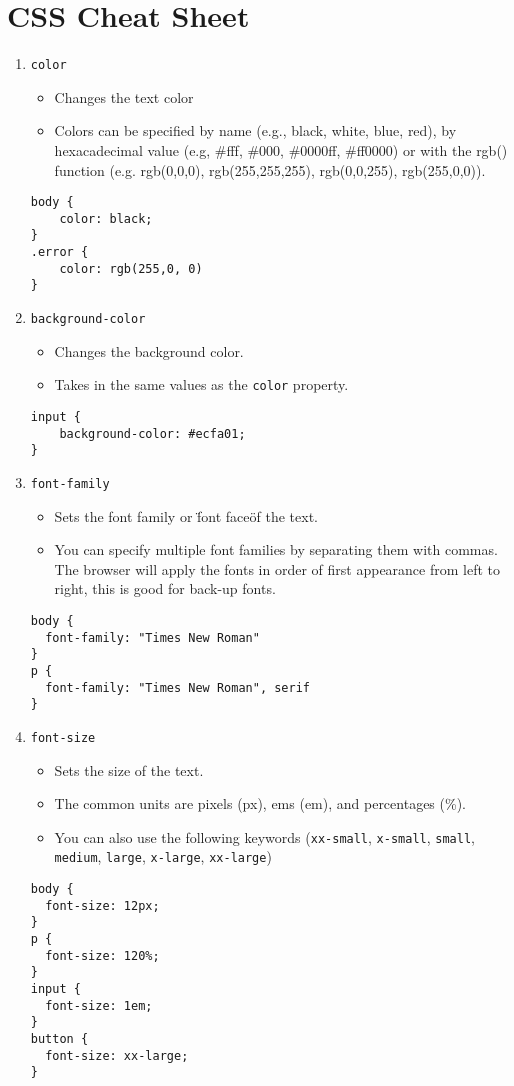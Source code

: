 \documentclass[12pt]{article}
\begin{document}
\section{CSS Cheat Sheet}

\begin{enumerate}

\item{\texttt{color}}  
\begin{itemize}
    \item Changes the text color
    \item Colors can be specified by name (e.g., black, white, blue, red), by hexacadecimal value (e.g, \#fff, \#000, \#0000ff, \#ff0000) or with the rgb() function (e.g. rgb(0,0,0), rgb(255,255,255), rgb(0,0,255), rgb(255,0,0)).
\end{itemize}
\begin{lstlisting}[frame=single]
body {
    color: black;
}
.error {
    color: rgb(255,0, 0)
}
\end{lstlisting}

\item{\texttt{background-color}}
\begin{itemize}
    \item Changes the background color.  
    \item Takes in the same values as the \texttt{color} property.
\end{itemize}    
\begin{lstlisting}[frame=single]
input {
    background-color: #ecfa01; 
}
\end{lstlisting}
    
\item{\texttt{font-family}}
\begin{itemize}
    \item Sets the font family or \"font face\" of the text.
    \item You can specify multiple font families by separating them with commas.  The browser will apply the fonts in order of first appearance from left to right, this is good for back-up fonts.
\end{itemize}    
\begin{lstlisting}[frame=single]
body {
  font-family: "Times New Roman"
}
p {
  font-family: "Times New Roman", serif
}
\end{lstlisting}
    

\item{\texttt{font-size}}
\begin{itemize}
    \item Sets the size of the text.  
    \item The common units are pixels (px), ems (em), and percentages (\%).  
    \item You can also use the following keywords (\texttt{xx-small}, \texttt{x-small}, \texttt{small}, \texttt{medium}, \texttt{large}, \texttt{x-large}, \texttt{xx-large})
\end{itemize}    
\begin{lstlisting}[frame=single]
body {
  font-size: 12px;
}
p {
  font-size: 120%;
}
input {
  font-size: 1em;
}
button {
  font-size: xx-large;
}
\end{lstlisting}
    

\end{enumerate}
\end{document}

